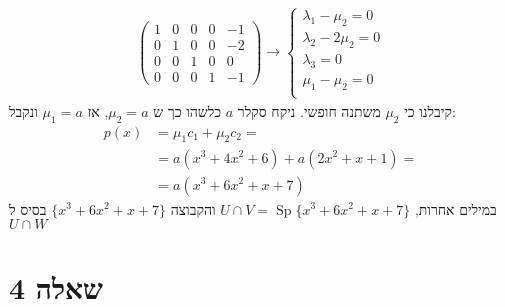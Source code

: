 \documentclass{article}
\DeclareMathOperator\Sp{Sp}
\begin{document}
\begin{align*}
    \begin{pmatrix}
        1 & 0 & 0 & 0 & -1 \\
        0 & 1 & 0 & 0 & -2 \\
        0 & 0 & 1 & 0 & 0  \\
        0 & 0 & 0 & 1 & -1
    \end{pmatrix}
    \rightarrow
    \begin{cases}
        \lambda_1-\mu_2=0  \\
        \lambda_2-2\mu_2=0 \\
        \lambda_3=0        \\
        \mu_1-\mu_2=0      \\
    \end{cases}
\end{align*}
קיבלנו כי $\mu_2$ משתנה חופשי. ניקח סקלר $a$ כלשהו כך ש $\mu_2=a$, אז $\mu_1=a$ ונקבל:
\begin{align*}
    p(x) & =\mu_1c_1+\mu_2c_2=          \\
         & =a(x^3+4x^2+6) +a(2x^2+x+1)= \\
         & = a(x^3+6x^2+x+7)
\end{align*}
במילים אחרות, $U\cap V=\Sp\{ x^3+6x^2+x+7 \}$ והקבוצה $\{ x^3+6x^2+x+7 \}$ בסיס ל$U\cap W$

\section*{שאלה 4}
\end{document}
